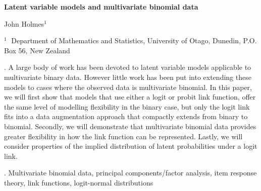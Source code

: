 \documentclass[12pt]{article}
\begin{document}
\begin{flushleft}


{\LARGE\bf Latent variable models and multivariate binomial data}


\vspace{1.0cm}

John Holmes$^1$

\begin{description}

\item $^1 \;$ Department of Mathematics and Statistics, University of Otago,
Dunedin, P.O. Box 56, New Zealand


\end{description}

\end{flushleft}


\vspace{0.75cm}

. A large body of work has been devoted to latent variable models applicable to multivariate binary data. However little work has been put into extending these models to cases where the observed data is multivariate binomial. In this paper, we will first show that models that use either a logit or probit link function, offer the same level of modelling flexibility in the binary case, but only the logit link fits into a data augmentation approach that compactly extends from binary to binomial. Secondly, we will demonstrate that multivariate binomial data provides greater flexibility in how the link function can be represented. Lastly, we will consider properties of the implied distribution of latent probabilities under a logit link.

\vskip 2mm

.
Multivariate binomial data, principal components/factor analysis, item response theory, link functions, logit-normal distributions
\end{document}
